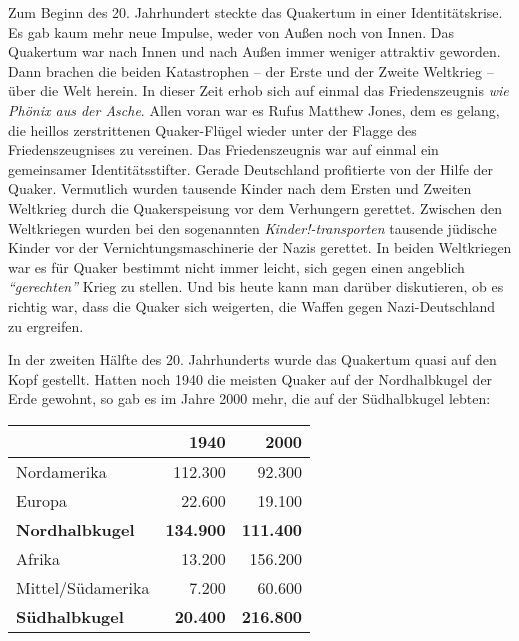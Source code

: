 Zum Beginn des 20. Jahrhundert steckte das Quakertum in einer Identitätskrise.
Es gab kaum mehr neue Impulse, weder von Außen
noch von Innen. Das Quakertum war
nach Innen und nach Außen immer weniger attraktiv geworden. Dann brachen die
beiden Katastrophen -- der Erste und der Zweite Weltkrieg --
über die Welt
herein. In dieser Zeit erhob sich auf einmal das Friedenszeugnis
\textit{wie
Phönix aus der Asche}. Allen voran war es Rufus Matthew Jones,
 dem
es gelang, die heillos zerstrittenen Quaker-Flügel wieder unter der Flagge des
Friedenszeugnises zu vereinen. Das Friedenszeugnis war auf einmal ein
gemeinsamer Identitätsstifter. Gerade Deutschland
 profitierte von der Hilfe der
Quaker. Vermutlich wurden tausende Kinder nach dem Ersten und Zweiten Weltkrieg
durch die Quakerspeisung  vor dem Verhungern gerettet.
Zwischen den Weltkriegen
wurden bei den sogenannten \textit{Kinder!-transporten}
tausende jüdische Kinder 
vor der Vernichtungsmaschinerie der Nazis gerettet. In beiden Weltkriegen war es
für Quaker bestimmt nicht immer leicht, sich gegen einen
angeblich \textit{"`gerechten"'}
Krieg zu stellen. Und bis heute kann man darüber diskutieren, ob es richtig
war, dass die Quaker sich weigerten, die Waffen gegen Nazi-Deutschland zu
ergreifen.

\medskip

In der zweiten Hälfte des 20. Jahrhunderts wurde das Quakertum quasi auf den
Kopf
gestellt. Hatten noch 1940 die meisten Quaker auf der Nordhalbkugel der Erde
gewohnt, so gab es im Jahre 2000 mehr, die auf der Südhalbkugel lebten:

\begin{center}
\begin{tabular}{|l|r|r|} \hline
                        & \textbf{1940}        & \textbf{2000}    \\ \hline
\hline
Nordamerika             & 112.300              & 92.300           \\ \hline
Europa                  & 22.600               & 19.100           \\ \hline
\textbf{Nordhalbkugel}  & \textbf{134.900}     & \textbf{111.400} \\ \hline
Afrika                  & 13.200               & 156.200          \\ \hline
Mittel/Südamerika       & 7.200                & 60.600           \\ \hline
\textbf{Südhalbkugel}   & \textbf{20.400}      & \textbf{216.800} \\ \hline
\end{tabular}
\end{center}


